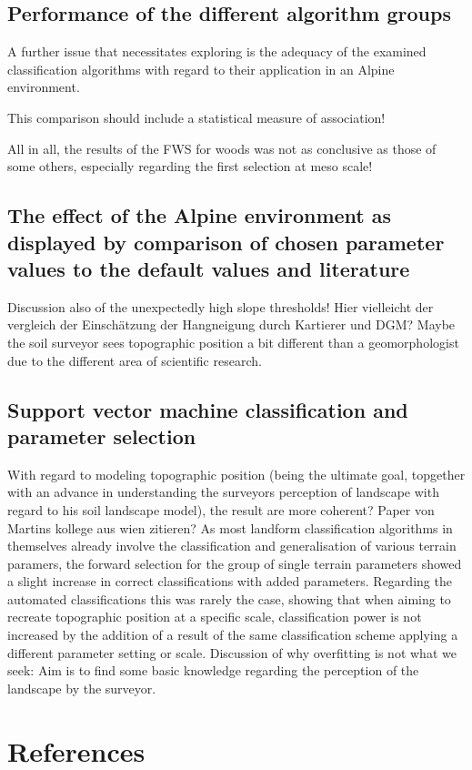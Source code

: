 \documentclass[final,1p,times,twocolumn,authoryear]{elsarticle}
\begin{document}
\subsection{Performance of the different algorithm groups} 
A further issue that necessitates exploring is the adequacy of the examined classification algorithms with regard to their application in an Alpine environment. 

This comparison should include a statistical measure of association!

All in all, the results of the FWS for woods was not as conclusive as those of some others, especially regarding the first selection at meso scale!
\subsection{The effect of the Alpine environment as displayed by comparison of chosen parameter values to the default values and literature} 
Discussion also of the unexpectedly high slope thresholds!
Hier vielleicht der vergleich der Einschätzung der Hangneigung durch Kartierer und DGM?  Maybe the soil surveyor sees topographic position a bit different than a geomorphologist due to the different area of scientific research.

\subsection{Support vector machine classification and parameter selection}
With regard to modeling topographic position (being the ultimate goal, topgether with an advance in understanding the surveyors perception of landscape with regard to his soil landscape model), the result are more coherent? Paper von Martins kollege aus wien zitieren?
As most landform classification algorithms in themselves already involve the classification and generalisation of various terrain paramers, the forward selection for the group of single terrain parameters showed a slight increase in correct classifications with added parameters. Regarding the automated classifications this was rarely the case, showing that when aiming to recreate topographic position at a specific scale, classification power is not increased by the addition of a result of the same classification scheme applying a different parameter setting or scale.
Discussion of why overfitting is not what we seek: Aim is to find some basic knowledge regarding the perception of the landscape by the surveyor.


\clearpage
\section*{References}

\end{document}
